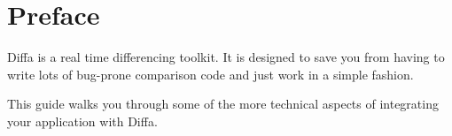 \chapter{Preface}

Diffa is a real time differencing toolkit. It is designed to save you from having to write lots of bug-prone comparison code and just work in a simple fashion.

This guide walks you through some of the more technical aspects of integrating your application with Diffa.